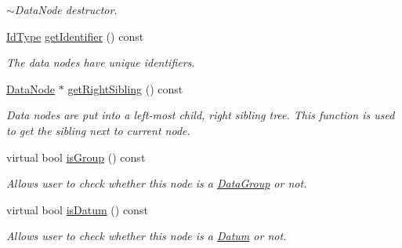 \begin{DoxyCompactItemize}
\begin{DoxyCompactList}\small\item\em $\sim$\+Data\+Node destructor. \end{DoxyCompactList}\item 
\hyperlink{namespaceDatabase_abca840aa37b2fd02e1d82e32a8171437}{Id\+Type} \hyperlink{classDatabase_1_1DataNode_a09dc909b1f926bb3cedb4b383d73abe0}{get\+Identifier} () const 
\begin{DoxyCompactList}\small\item\em The data nodes have unique identifiers. \end{DoxyCompactList}\item 
\hyperlink{classDatabase_1_1DataNode}{Data\+Node} $\ast$ \hyperlink{classDatabase_1_1DataNode_a6a947c91feca4c555c4f5f0197b232ab}{get\+Right\+Sibling} () const 
\begin{DoxyCompactList}\small\item\em Data nodes are put into a left-\/most child, right sibling tree. This function is used to get the sibling next to current node. \end{DoxyCompactList}\item 
virtual bool \hyperlink{classDatabase_1_1DataNode_acba6b71939d41a2b88a9e521788033f4}{is\+Group} () const 
\begin{DoxyCompactList}\small\item\em Allows user to check whether this node is a \hyperlink{classDatabase_1_1DataGroup}{Data\+Group} or not. \end{DoxyCompactList}\item 
virtual bool \hyperlink{classDatabase_1_1DataNode_aaaef3938872f97819ed1c160c74c97cc}{is\+Datum} () const 
\begin{DoxyCompactList}\small\item\em Allows user to check whether this node is a \hyperlink{classDatabase_1_1Datum}{Datum} or not. \end{DoxyCompactList}\end{DoxyCompactItemize}
